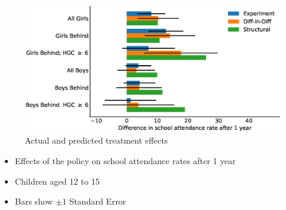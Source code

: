 \documentclass[11pt]{beamer}
\begin{document}
\begin{frame}[c]%
    \begin{figure}
        \caption{\textcolor{mediumelectricblue}{Actual and predicted treatment effects}}
        \includegraphics[width=\textwidth]{graphs/table0.eps}
    \end{figure}
    \vspace{-0.8cm}
    \pause
    \begin{itemize}
        \item Effects of the policy on school attendance rates after 1 year
        \item Children aged 12 to 15
        \item Bars show $\pm 1$ Standard Error
    \end{itemize}
\end{frame}
\end{document}
